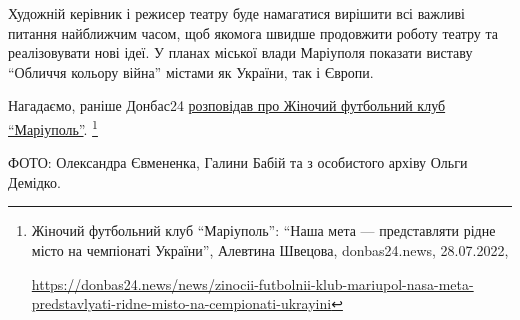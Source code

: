 Художній керівник і режисер театру буде намагатися вирішити всі важливі питання
найближчим часом, щоб якомога швидше продовжити роботу театру та реалізовувати
нові ідеї. У планах міської влади Маріуполя показати виставу \enquote{Обличчя кольору
війна} містами як України, так і Європи.


Нагадаємо, раніше Донбас24
\href{https://donbas24.news/news/zinocii-futbolnii-klub-mariupol-nasa-meta-predstavlyati-ridne-misto-na-cempionati-ukrayini}{розповідав
про Жіночий футбольний клуб \enquote{Маріуполь}}.%
\footnote{Жіночий футбольний клуб \enquote{Маріуполь}: \enquote{Наша мета — представляти рідне місто на чемпіонаті України}, Алевтина Швецова, donbas24.news, 28.07.2022, \par%
\url{https://donbas24.news/news/zinocii-futbolnii-klub-mariupol-nasa-meta-predstavlyati-ridne-misto-na-cempionati-ukrayini}%
}

ФОТО: Олександра Євмененка, Галини Бабій та з особистого архіву Ольги Демідко.

{}

